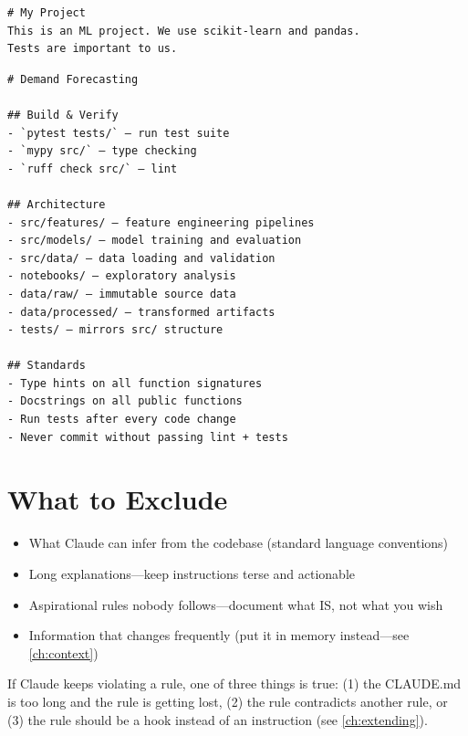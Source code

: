 \begin{fullwidth}
\begin{beforeafter}
\before
\begin{verbatim}
# My Project
This is an ML project. We use scikit-learn and pandas.
Tests are important to us.
\end{verbatim}

\after
\begin{verbatim}
# Demand Forecasting

## Build & Verify
- `pytest tests/` — run test suite
- `mypy src/` — type checking
- `ruff check src/` — lint

## Architecture
- src/features/ — feature engineering pipelines
- src/models/ — model training and evaluation
- src/data/ — data loading and validation
- notebooks/ — exploratory analysis
- data/raw/ — immutable source data
- data/processed/ — transformed artifacts
- tests/ — mirrors src/ structure

## Standards
- Type hints on all function signatures
- Docstrings on all public functions
- Run tests after every code change
- Never commit without passing lint + tests
\end{verbatim}
\end{beforeafter}
\end{fullwidth}


\section{What to Exclude}
\label{sec:what-to-exclude}

\begin{itemize}
  \item What Claude can infer from the codebase (standard language conventions)
  \item Long explanations---keep instructions terse and actionable
  \item Aspirational rules nobody follows---document what IS, not what you wish
  \item Information that changes frequently (put it in memory instead---see \cref{ch:context})
\end{itemize}

\begin{tipbox}
If Claude keeps violating a rule, one of three things is true:
(1) the CLAUDE.md is too long and the rule is getting lost,
(2) the rule contradicts another rule, or
(3) the rule should be a hook instead of an instruction (see \cref{ch:extending}).
\end{tipbox}

